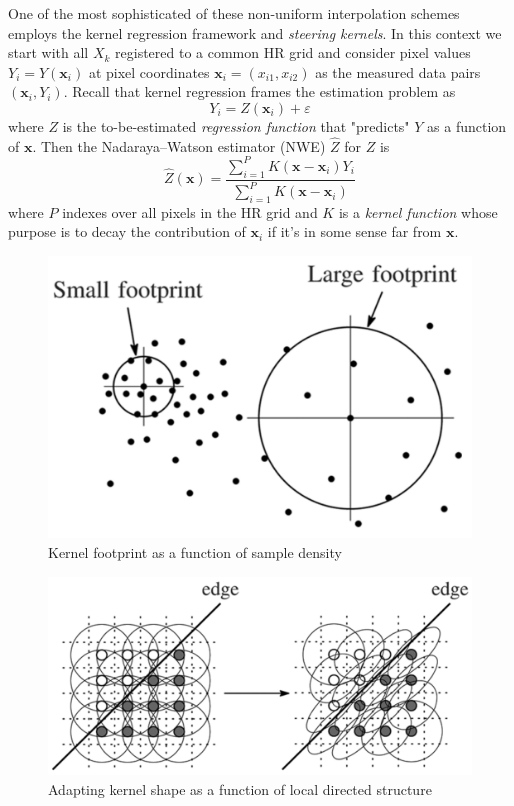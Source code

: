 One of the most sophisticated of these non-uniform interpolation schemes employs the kernel regression framework and \textit{steering kernels}\cite{Takeda2007}.
%
In this context we start with all $X_k$ registered to a common HR grid and consider pixel values $Y_i = Y(\bm{x}_i)$ at pixel coordinates $\bm{x}_i = (x_{i1},x_{i2})$ as the measured data pairs $(\bm{x}_i, Y_i)$.
%
Recall that kernel regression frames the estimation problem as
\newcommand*{\bx}{\bm{x}}
\newcommand*{\bxi}{\bm{x}_i}
\newcommand*{\delx}{\bx - \bxi}
\newcommand*{\zbx}{Z(\bx)}
\newcommand*{\zbxi}{Z(\bxi)}
\newcommand*{\bb}{\bm{\beta}}
\newcommand*{\hzbx}{\hat{Z}(\bx)}
\begin{equation}
    Y_i = Z(\bx_i) + \varepsilon
\end{equation}
where $Z$ is the to-be-estimated \textit{regression function} that "predicts" $Y$ as a function of $\bx$.
Then the Nadaraya–Watson estimator (NWE)\cite{Nadaraya} $\hat{Z}$ for $Z$ is
\begin{equation}
    \hat{Z}(\bx) = \frac{\sum_{i=1}^{P}K(\delx)Y_i}{\sum_{i=1}^{P}K(\delx)}
\end{equation}
where $P$ indexes over all pixels in the HR grid and $K$ is a \textit{kernel function} whose purpose is to decay the contribution of $\bxi$ if it's in some sense far from $\bx$.
%
\begin{figure}
    \centering
    \includegraphics[width=.8\linewidth]{figures/footprint.png}
    \caption{Kernel footprint as a function of sample density\cite{Takeda2007}}
    \label{fig:footprint}
\end{figure}
\begin{figure}
    \centering
    \includegraphics[width=\linewidth]{figures/steering.png}
    \caption{Adapting kernel shape as a function of local directed structure\cite{Takeda2007}}
    \label{fig:steering}
\end{figure}
